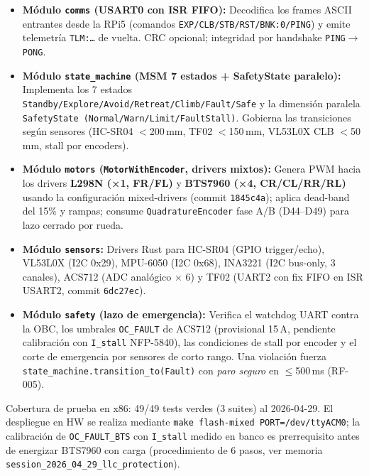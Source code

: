 \begin{itemize}
    \item \textbf{Módulo \texttt{comms} (USART0 con ISR FIFO):} Decodifica los frames ASCII entrantes desde la RPi5 (comandos \texttt{EXP/CLB/STB/RST/BNK:0/PING}) y emite telemetría \texttt{TLM:\dots} de vuelta. CRC opcional; integridad por handshake \texttt{PING$\rightarrow$PONG}.
    \item \textbf{Módulo \texttt{state\_machine} (MSM 7 estados + SafetyState paralelo):} Implementa los 7 estados \texttt{Standby/Explore/Avoid/Retreat/Climb/Fault/Safe} y la dimensión paralela \texttt{SafetyState (Normal/Warn/Limit/FaultStall)}. Gobierna las transiciones según sensores (HC-SR04 $<$200\,mm, TF02 $<$150\,mm, VL53L0X CLB $<$50\,mm, stall por encoders).
    \item \textbf{Módulo \texttt{motors} (\texttt{MotorWithEncoder}, drivers mixtos):} Genera PWM hacia los drivers \textbf{L298N (×1, FR/FL)} y \textbf{BTS7960 (×4, CR/CL/RR/RL)} usando la configuración mixed-drivers (commit \texttt{1845c4a}); aplica dead-band del 15\% y rampas; consume \texttt{QuadratureEncoder} fase A/B (D44--D49) para lazo cerrado por rueda.
    \item \textbf{Módulo \texttt{sensors}:} Drivers Rust para HC-SR04 (GPIO trigger/echo), VL53L0X (I2C 0x29), MPU-6050 (I2C 0x68), INA3221 (I2C bus-only, 3 canales), ACS712 (ADC analógico × 6) y TF02 (UART2 con fix FIFO en ISR USART2, commit \texttt{6dc27ec}).
    \item \textbf{Módulo \texttt{safety} (lazo de emergencia):} Verifica el watchdog UART contra la OBC, los umbrales \texttt{OC\_FAULT} de ACS712 (provisional 15\,A, pendiente calibración con \texttt{I\_stall} NFP-5840), las condiciones de stall por encoder y el corte de emergencia por sensores de corto rango. Una violación fuerza \texttt{state\_machine.transition\_to(Fault)} con \textit{paro seguro} en $\le$500\,ms (RF-005).
\end{itemize}

Cobertura de prueba en x86: 49/49 tests verdes (3 suites) al 2026-04-29. El despliegue en HW se realiza mediante \texttt{make flash-mixed PORT=/dev/ttyACM0}; la calibración de \texttt{OC\_FAULT\_BTS} con \texttt{I\_stall} medido en banco es prerrequisito antes de energizar BTS7960 con carga (procedimiento de 6 pasos, ver memoria \texttt{session\_2026\_04\_29\_llc\_protection}).


